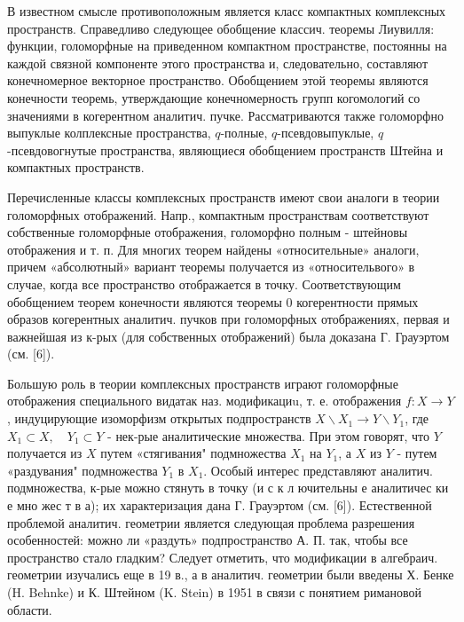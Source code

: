\documentclass[10pt]{article}
\begin{document}
В известном смысле противоположным является класс компактных комплексных пространств. Справедливо следующее обобщение классич. теоремы Лиувилля: функции, голоморфные на приведенном компактном пространстве, постоянны на каждой связной компоненте этого пространства и, следовательно, составляют конечномерное векторное пространство. Обобщением этой теоремы являются конечности теоремь, утверждающие конечномерность групп когомологий со значениями в когерентном аналитич. пучке. Рассматриваются также голоморфно выпуклые колплексные пространства, $q$-полные, $q$-псевдовыпуклые, $q$-псевдовогнутые пространства, являющиеся обобщением пространств Штейна и компактных пространств.



Перечисленные классы комплексных пространств имеют свои аналоги в теории голоморфных отображений. Напр., компактным пространствам соответствуют собственные голоморфные отображения, голоморфно полным - штейновы отображения и т. п. Для многих теорем найдены «относительные» аналоги, причем «абсолютный» вариант теоремы получается из «относительвого» в случае, когда все пространство отображается в точку. Соответствующим обобщением теорем конечности являются теоремы 0 когерентности прямых образов когерентных аналитич. пучков при голоморфных отображениях, первая и важнейшая из к-рых (для собственных отображений) была доказана Г. Грауэртом (см. [6]).



Большую роль в теории комплексных пространств играют голоморфные отображения специального видатак наз. модификациu, т. е. отображения $f: X \rightarrow Y$, индуцирующие изоморфизм открытых подпространств $X \backslash X_{1} \rightarrow Y \backslash Y_{1}$, где $X_{1} \subset X, \quad Y_{1} \subset Y$ - нек-рые аналитические множества. При этом говорят, что $Y$ получается из $X$ путем «стягивания" подмножества $X_{1}$ на $Y_{1}$, а $X$ из $Y$ - путем «раздувания" подмножества $Y_{1}$ в $X_{1}$. Особый интерес представляют аналитич. подмножества, к-рые можно стянуть в точку (и с к л ючительны е аналитичес ки е мно жес т в а); их характеризация дана Г. Грауэртом (см. [6]). Естественной проблемой аналитич. геометрии является следующая проблема разрешения особенностей: можно ли «раздуть» подпространство А. П. так, чтобы все пространство стало гладким? Следует отметить, что модификации в алгебраич. геометрии изучались еще в 19 в., а в аналитич. геометрии были введены Х. Бенке (H. Behnke) и К. Штейном (K. Stein) в 1951 в связи с понятием римановой области.
\end{document}
